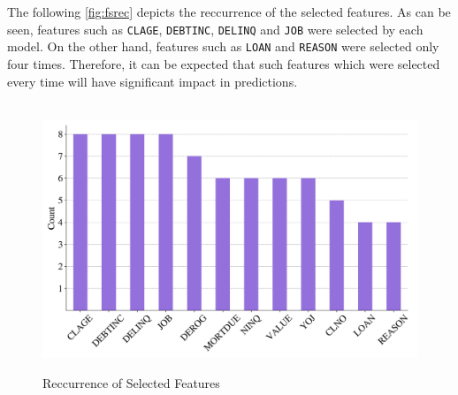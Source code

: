 The following \autoref{fig:fsrec} depicts the reccurrence of the selected features. As can be seen, features such as \texttt{CLAGE}, \texttt{DEBTINC}, \texttt{DELINQ} and \texttt{JOB} were selected by each model. 
On the other hand, features such as \texttt{LOAN} and \texttt{REASON} were selected only four times. Therefore, it can be expected that such features which were selected every time will have significant impact in predictions.
\begin{figure}[H]
\centering
\caption{Reccurrence of Selected Features}\vspace{0.5em}
\label{fig:fsrec}\
\includegraphics[width=120mm]{Figures/Recurrence_Selected_Features.jpg}

\vspace{-1em}
\end{figure}


